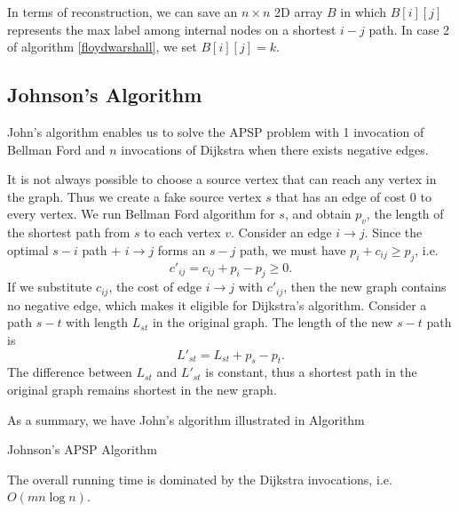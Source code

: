 In terms of reconstruction, we can save an $n\times n$ 2D array $B$ in which $B[i][j]$ represents the max label among internal nodes on a shortest $i-j$ path. In case 2 of algorithm \ref{floydwarshall}, we set $B[i][j]=k$.
\subsection{Johnson's Algorithm}
John's algorithm enables us to solve the APSP problem with 1 invocation of Bellman Ford and $n$ invocations of Dijkstra when there exists negative edges. 

It is not always possible to choose a source vertex that can reach any vertex in the graph. Thus we create a fake source vertex $s$ that has an edge of cost 0 to every vertex. We run Bellman Ford algorithm for $s$, and obtain $p_v$, the length of the shortest path from $s$ to each vertex $v$. Consider an edge $i\rightarrow j$. Since the optimal $s-i$ path + $i\rightarrow j$ forms an $s-j$ path, we must have $p_i+c_{ij}\geq p_j$, i.e. $$c'_{ij}=c_{ij}+p_i-p_j\geq 0.$$
If we substitute $c_{ij}$, the cost of edge $i\rightarrow j$ with $c'_{ij}$, then the new graph contains no negative edge, which makes it eligible for Dijkstra's algorithm. Consider a path $s-t$ with length $L_{st}$ in the original graph.  The length of the new $s-t$ path is 
$$L'_{st}=L_{st}+p_s-p_t. $$
The difference between $L_{st}$ and $L'_{st}$ is constant, thus a shortest path in the original graph remains shortest in the new graph.

As a summary, we have John's algorithm illustrated in Algorithm 
\begin{algorithm}[ht]
\caption{Johnson's APSP Algorithm}\label{apspjohnson}
\begin{algorithmic}[1]
\end{algorithmic}
\end{algorithm}

The overall running time is dominated by the Dijkstra invocations, i.e. $O(mn\log n)$. 
\ifx\PREAMBLE\undefined

\fi
